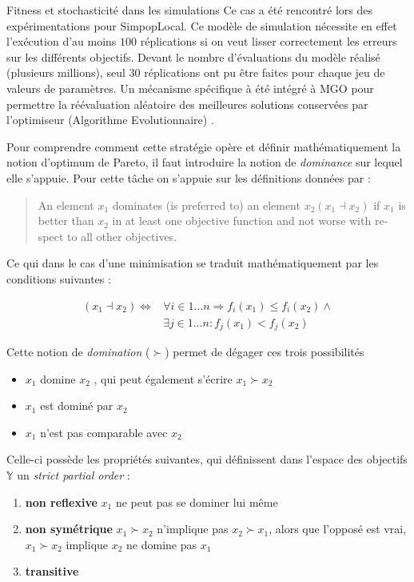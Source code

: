 \begin{testiv}{Fitness et stochasticité dans les simulations}{}
Ce cas a été rencontré lors des expérimentations pour SimpopLocal. Ce modèle de simulation nécessite en effet l'exécution d'au moins $100$ réplications si on veut lisser correctement les erreurs sur les différents objectifs. Devant le nombre d'évaluations du modèle réalisé (plusieurs millions), seul $30$ réplications ont pu être faites pour chaque jeu de valeurs de paramètres. Un mécanisme spécifique à été intégré à MGO pour permettre la réévaluation aléatoire des meilleures solutions conservées par l'optimiseur (Algorithme Evolutionnaire) \autocite[193]{Schmitt2014}.

\end{testiv}

Pour comprendre comment cette stratégie opère et définir mathématiquement la notion d'optimum de Pareto, il faut introduire la notion de \textit{dominance} sur lequel elle s'appuie. Pour cette tâche on s'appuie sur les définitions données par \textcite[65]{Weise2011} :

\foreignblockquote{english}[{\cite[65]{Weise2011}}]{An element $x_1$ dominates (is preferred to) an element $x_2 (x_1 \dashv x_2)$ if $x_1$ is better than $x_2$ in at least one objective function and not worse with respect to all other objectives.}

Ce qui dans le cas d'une minimisation se traduit mathématiquement par les conditions suivantes :

\begin{align*}
	(x_1 \dashv x_2) \Leftrightarrow &\forall i \in 1 \dotsc n \Rightarrow  f_i (x_1) \leq f_i (x_2) \land \\
	&\exists j \in 1 \dotsc n : f_j (x_1) < f_j (x_2)
\end{align*}

Cette notion de \textit{domination} ($\succ$)  permet de dégager ces trois possibilités

\begin{itemize}
\item $x_1$ domine $x_2$ , qui peut également s'écrire $x_1 \succ x_2$
\item $x_1$ est dominé par $x_2$
\item $x_1$ n'est pas comparable avec $x_2$
\end{itemize}

Celle-ci possède les propriétés suivantes, qui définissent dans l'espace des objectifs $\mathbb{Y}$ un \textit{strict partial order} :

\begin{enumerate}
\item{\textbf{non reflexive}}  $x_1$ ne peut pas se dominer lui même
\item{\textbf{non symétrique}} $ x_1 \succ x_2$ n'implique pas $x_2 \succ x_1$, alors que l'opposé est vrai, $x_1 \succ x_2$ implique $x_2$ ne domine pas $x_1$
\item{\textbf{transitive} }
\end{enumerate}

